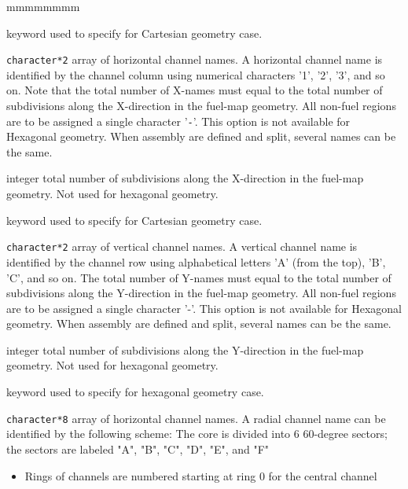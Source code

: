 \begin{ListeDeDescription}{mmmmmmmm}
\item[\moc{NXNAME}] keyword used to specify  for 
Cartesian geometry case.

\item[\dusa{XNAME}] \texttt{character*2} array of horizontal channel
names. A horizontal channel name is identified by the channel column
using numerical characters '1', '2', '3', and so on.
Note that the total number of X-names must equal to the total number
of subdivisions along the X-direction in the fuel-map geometry.
All non-fuel regions are to be assigned a single character '{\tt -}'.
This option is not available for  Hexagonal geometry. When assembly are defined and split, several names can be the same. 

\item[\dusa{nx}] integer total number of subdivisions along the
X-direction in the fuel-map geometry. Not used for  hexagonal
geometry.

\item[\moc{NYNAME}] keyword used to specify  for
 Cartesian geometry case.

\item[\dusa{YNAME}] \texttt{character*2} array of vertical channel
names. A vertical channel name is identified by the channel row using
alphabetical letters 'A' (from the top), 'B', 'C', and so on.
The total number of Y-names must equal to the total number of
subdivisions along the Y-direction in the fuel-map geometry.
All non-fuel regions are to be assigned a single character '-'.
This option is not available for  Hexagonal geometry. When assembly are defined and split, several names can be the same.

\item[\dusa{ny}] integer total number of subdivisions along the
Y-direction in the fuel-map geometry. Not used for  hexagonal
geometry.

\item[\moc{NHNAME}] keyword used to specify  for 
hexagonal geometry case.

\item[\dusa{HNAME}] \texttt{character*8} array of horizontal channel
names. A radial channel name can be identified by the following scheme:
The core is divided into 6 60-degree sectors; the sectors are labeled "A", "B", "C", "D", "E", and "F"
\begin{itemize}
\item Rings of channels are numbered starting at ring 0 for the central channel


\end{itemize}
\end{ListeDeDescription}
